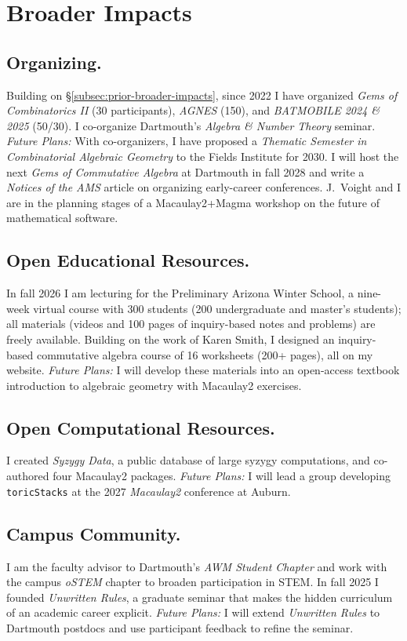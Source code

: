 \documentclass[11pt,reqno]{amsart}
\theoremstyle{remark}
\begin{document}
\section{Broader Impacts}\label{sec:broader-impacts}
\subsection{Organizing.} Building on \S\ref{subsec:prior-broader-impacts}, since 2022 I have organized \textit{Gems of Combinatorics II} (30 participants), \textit{AGNES} (150), and \textit{BATMOBILE 2024 \& 2025} (50/30). I co-organize Dartmouth's \textit{Algebra \& Number Theory} seminar. \emph{Future Plans:}  With co-organizers, I have proposed a \textit{Thematic Semester in Combinatorial Algebraic Geometry} to the Fields Institute for 2030. I will host the next \textit{Gems of Commutative Algebra} at Dartmouth in fall 2028 and write a \textit{Notices of the AMS} article on organizing early-career conferences. J.~Voight and I are in the planning stages of a Macaulay2+Magma workshop on the future of mathematical software.

\subsection{Open Educational Resources.} In fall 2026 I am lecturing for the Preliminary Arizona Winter School, a nine-week virtual course with 300 students (200 undergraduate and master's students); all materials (videos and 100 pages of inquiry-based notes and problems) are freely available. Building on the work of Karen Smith, I designed an inquiry-based commutative algebra course of 16 worksheets (200+ pages), all on my website.  \emph{Future Plans:} I will develop these materials into an open-access textbook introduction to algebraic geometry with Macaulay2 exercises.
 
\subsection{Open Computational Resources.} I created \textit{Syzygy Data}, a public database of large syzygy computations, and co-authored four Macaulay2 packages. \emph{Future Plans:} I will lead a group developing \texttt{toricStacks} at the 2027 \textit{Macaulay2} conference at Auburn.

\subsection{Campus Community.} I am the faculty advisor to Dartmouth's \textit{AWM Student Chapter} and work with the campus \textit{oSTEM} chapter to broaden participation in STEM. In fall 2025 I founded \textit{Unwritten Rules}, a graduate seminar that makes the hidden curriculum of an academic career explicit. \emph{Future Plans:} I will extend \textit{Unwritten Rules} to Dartmouth postdocs and use participant feedback to refine the seminar.
\end{document}
